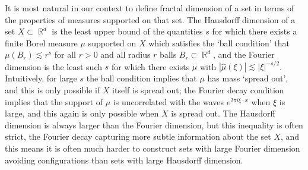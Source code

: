 \documentclass[11pt]{article}
\DeclareMathOperator{\RR}{\mathbb{R}}
\begin{document}

It is most natural in our context to define fractal dimension of a set in terms of the properties of measures supported on that set. The Hausdorff dimension of a set $X \subset \RR^d$ is the least upper bound of the quantities $s$ for which there exists a finite Borel measure $\mu$ supported on $X$ which satisfies the `ball condition' that $\mu(B_r) \lesssim r^s$ for all $r > 0$ and all radius $r$ balls $B_r \subset \RR^d$, and the Fourier dimension is the least such $s$ for which there exists $\mu$ with $|\widehat{\mu}(\xi)| \lesssim |\xi|^{-s/2}$. Intuitively, for large $s$ the ball condition implies that $\mu$ has mass `spread out', and this is only possible if $X$ itself is spread out; the Fourier decay condition implies that the support of $\mu$ is uncorrelated with the waves $e^{2 \pi i \xi \cdot x}$ when $\xi$ is large, and this again is only possible when $X$ is spread out. The Hausdorff dimension is always larger than the Fourier dimension, but this inequality is often strict, the Fourier decay capturing more subtle information about the set $X$, and this means it is often much harder to construct sets with large Fourier dimension avoiding configurations than sets with large Hausdorff dimension.
\end{document}
